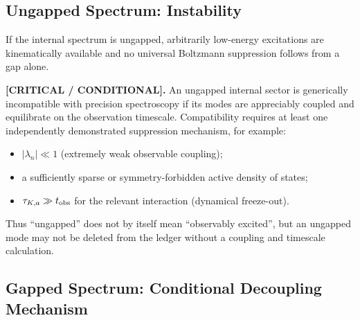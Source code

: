 %
    \subsection{Ungapped Spectrum: Instability}

        If the internal spectrum is ungapped, arbitrarily low-energy
        excitations are kinematically available and no universal Boltzmann
        suppression follows from a gap alone.

        \textbf{[CRITICAL / CONDITIONAL].}
        An ungapped internal sector is generically incompatible with precision
        spectroscopy if its modes are appreciably coupled and equilibrate on the
        observation timescale.  Compatibility requires at least one independently
        demonstrated suppression mechanism, for example:
        \begin{itemize}
            \item $|\lambda_n|\ll1$ (extremely weak observable coupling);
            \item a sufficiently sparse or symmetry-forbidden active density of states;
            \item $\tau_{K,a}\gg t_{\rm obs}$ for the relevant interaction
            (dynamical freeze-out).
        \end{itemize}
        Thus ``ungapped'' does not by itself mean ``observably excited'', but an
        ungapped mode may not be deleted from the ledger without a coupling and
        timescale calculation.

    \subsection{Gapped Spectrum: Conditional Decoupling Mechanism}
        \label{subsec:canon_true_internal_gap}

